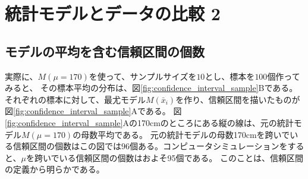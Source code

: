 \fi



\section{統計モデルとデータの比較 2}


\subsection{モデルの平均を含む信頼区間の個数}
実際に、$M(\mu=170)$を使って、$サンプルサイズを10$とし、標本を$100$個作ってみると、
その標本平均の分布は、図\ref{fig:confidence_interval_sample}Bである。
それぞれの標本に対して、最尤モデル$M(\bar{x}_i)$を作り、信頼区間を描いたものが図\ref{fig:confidence_interval_sample}Aである。
図\ref{fig:confidence_interval_sample}Aの170cmのところにある縦の線は、元の統計モデル$M(\mu=170)$の母数平均である。
元の統計モデルの母数170cmを跨いでいる信頼区間の個数はこの図では$96$個ある。コンピュータシミュレーションをすると、$\mu$を跨いでいる信頼区間の個数はおよそ95個である。
このことは、信頼区間の定義から明らかである。

